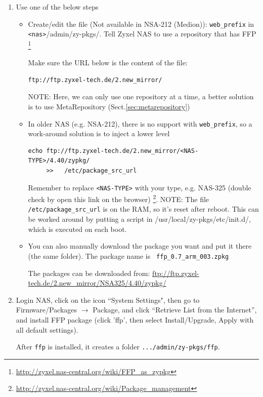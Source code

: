 \begin{enumerate}    
  \item Use one of the below steps
  
  \begin{itemize}
    \item Create/edit the file (Not available in NSA-212 (Medion)):
    \verb!web_prefix! in \verb!<nas>!/admin/zy-pkgs/. Tell Zyxel NAS to use a
    repository that has FFP  
\footnote{\url{http://zyxel.nas-central.org/wiki/FFP_as_zypkg}}  
  
Make sure the URL below is the content of the file: 
\begin{verbatim}
ftp://ftp.zyxel-tech.de/2.new_mirror/
\end{verbatim} 

NOTE: Here, we can only use one repository at a time, a better solution is to
use MetaRepository (Sect.\ref{sec:metarepository})

    \item In older NAS (e.g. NSA-212), there is no support with
    \verb!web_prefix!, so a work-around solution is to inject a lower level
\begin{verbatim}
echo ftp://ftp.zyxel-tech.de/2.new_mirror/<NAS-TYPE>/4.40/zypkg/
     >>   /etc/package_src_url
\end{verbatim}
Remember to replace \verb!<NAS-TYPE>! with your type, e.g. NAS-325 (double check
by open this link on the browser)
\footnote{\url{http://zyxel.nas-central.org/wiki/Package_management}}. NOTE: The
file \verb!/etc/package_src_url! is on the RAM, so it's reset after reboot. This
can be worked around by putting a script in /usr/local/zy-pkgs/etc/init.d/,
which is executed on each boot. 

    \item You can also manually download the package you want and put
it there (the same folder). The package name is \verb! ffp_0.7_arm_003.zpkg! 
  
The packages can be downloaded from:   \url{ftp://ftp.zyxel-tech.de/2.new_mirror/NSA325/4.40/zypkg/}
  \end{itemize}
  
  \item Login NAS, click on the icon ``System Settings", then
  go to Firmware/Packages $\rightarrow$ Package, and click ``Retrieve List from
  the Internet'', and install FFP package (click 'ffp', then select
  Install/Upgrade, Apply with all default settings).
  
After \verb!ffp! is installed, it creates a folder \verb!.../admin/zy-pkgs/ffp!.   
  

\end{enumerate}

